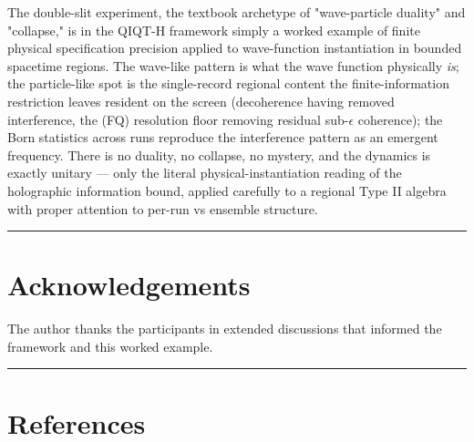 \documentclass[11pt,a4paper]{article}
\begin{document}
The double-slit experiment, the textbook archetype of "wave-particle duality" and "collapse," is in the QIQT-H framework simply a worked example of finite physical specification precision applied to wave-function instantiation in bounded spacetime regions. The wave-like pattern is what the wave function physically \emph{is}; the particle-like spot is the single-record regional content the finite-information restriction leaves resident on the screen (decoherence having removed interference, the (FQ) resolution floor removing residual sub-$\epsilon$ coherence); the Born statistics across runs reproduce the interference pattern as an emergent frequency. There is no duality, no collapse, no mystery, and the dynamics is exactly unitary — only the literal physical-instantiation reading of the holographic information bound, applied carefully to a regional Type II algebra with proper attention to per-run vs ensemble structure.

\medskip\hrule\medskip

\section{Acknowledgements}

The author thanks the participants in extended discussions that informed the framework and this worked example.

\medskip\hrule\medskip

\section{References}
\end{document}
